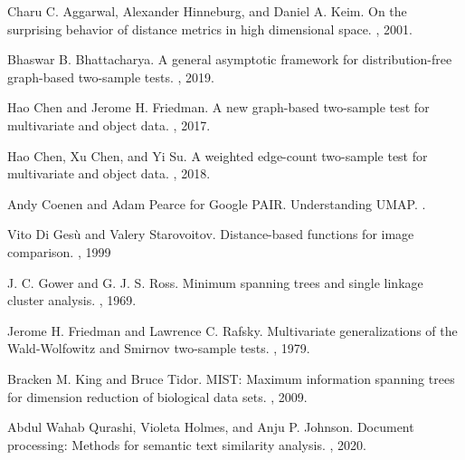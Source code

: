 \documentclass{article}
\begin{document}
\begin{thebibliography}{10}

Charu C. Aggarwal, Alexander Hinneburg, and Daniel A. Keim.
\newblock On the surprising behavior of distance metrics in high dimensional space.
, 2001.

Bhaswar B. Bhattacharya.
\newblock A general asymptotic framework for distribution-free graph-based two-sample tests.
, 2019.

Hao Chen and Jerome H. Friedman.
\newblock A new graph-based two-sample test for multivariate and object data.
, 2017.

Hao Chen, Xu Chen, and Yi Su.
\newblock A weighted edge-count two-sample test for multivariate and object data.
, 2018.

Andy Coenen and Adam Pearce for Google PAIR.
\newblock Understanding UMAP.
.

Vito Di Ges\`u and Valery Starovoitov.
\newblock Distance-based functions for image comparison.
, 1999

J. C. Gower and G. J. S. Ross.
\newblock Minimum spanning trees and single linkage cluster analysis.
, 1969.

Jerome H. Friedman and Lawrence C. Rafsky.
\newblock Multivariate generalizations of the Wald-Wolfowitz and Smirnov two-sample tests.
, 1979.

Bracken M. King and Bruce Tidor.
\newblock MIST: Maximum information spanning trees for dimension reduction of biological data sets.
, 2009.

Abdul Wahab Qurashi, Violeta Holmes, and Anju P. Johnson.
\newblock Document processing: Methods for semantic text similarity analysis.
, 2020.


\end{thebibliography}
\end{document}
